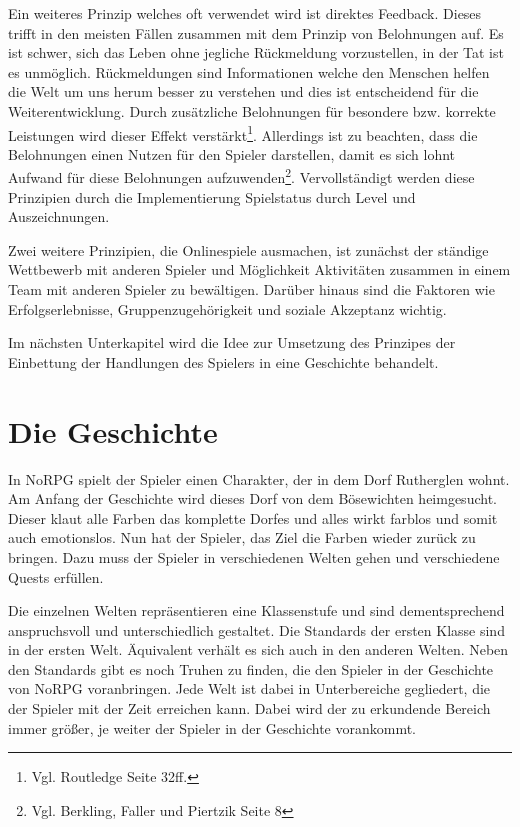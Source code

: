 Ein weiteres Prinzip welches oft verwendet wird ist direktes Feedback. Dieses trifft in den meisten Fällen zusammen mit dem Prinzip von Belohnungen auf. Es ist schwer, sich das Leben ohne jegliche Rückmeldung vorzustellen, in der Tat ist es unmöglich. Rückmeldungen sind Informationen welche den Menschen helfen die Welt um uns herum besser zu verstehen und dies ist entscheidend für die Weiterentwicklung. Durch zusätzliche Belohnungen für besondere bzw. korrekte Leistungen wird dieser Effekt verstärkt\footnote{Vgl. Routledge \cite{seriousGamesPrinciples} Seite 32ff.}. Allerdings ist zu beachten, dass die Belohnungen einen Nutzen für den Spieler darstellen, damit es sich lohnt Aufwand für diese Belohnungen aufzuwenden\footnote{Vgl. Berkling, Faller und Piertzik \cite{gamesPaper} Seite 8}. Vervollständigt werden diese Prinzipien durch die Implementierung Spielstatus durch Level und Auszeichnungen.

Zwei weitere Prinzipien, die Onlinespiele ausmachen, ist zunächst der ständige Wettbewerb mit anderen Spieler und Möglichkeit Aktivitäten zusammen in einem Team mit anderen Spieler zu bewältigen. Darüber hinaus sind die Faktoren wie Erfolgserlebnisse, Gruppenzugehörigkeit und soziale Akzeptanz wichtig. 

Im nächsten Unterkapitel wird die Idee zur Umsetzung des Prinzipes der Einbettung der Handlungen des Spielers in eine Geschichte behandelt.
	
\section{Die Geschichte}\label{geschichte}
In NoRPG spielt der Spieler einen Charakter, der in dem Dorf Rutherglen wohnt. Am Anfang der Geschichte wird dieses Dorf von dem Bösewichten heimgesucht. Dieser klaut alle Farben das komplette Dorfes und alles wirkt farblos und somit auch emotionslos. Nun hat der Spieler, das Ziel die Farben wieder zurück zu bringen. Dazu muss der Spieler in verschiedenen Welten gehen und verschiedene Quests erfüllen.

Die einzelnen Welten repräsentieren eine Klassenstufe und sind dementsprechend anspruchsvoll und unterschiedlich gestaltet. Die Standards der ersten Klasse sind in der ersten Welt. Äquivalent verhält es sich auch in den anderen Welten. Neben den Standards gibt es noch Truhen zu finden, die den Spieler in der Geschichte von NoRPG voranbringen. Jede Welt ist dabei in Unterbereiche gegliedert, die der Spieler mit der Zeit erreichen kann. Dabei wird der zu erkundende Bereich immer größer, je weiter der Spieler in der Geschichte vorankommt. 

